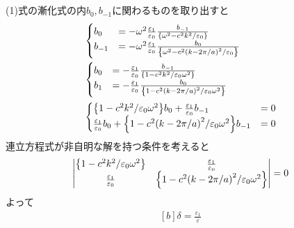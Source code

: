 \documentclass[../../master.tex]{subfiles}
\begin{document}
\section{}
(1)式の漸化式の内\(b_0,b_{-1}\)に関わるものを取り出すと
\begin{equation}\begin{aligned}[b]
    &\begin{cases}
        b_0 &= -\omega^2\frac{\varepsilon_1}{\varepsilon_0}\frac{b_{-1}}{\qty{\omega^2-c^2k^2/\varepsilon_0}}\\
        b_{-1} &= -\omega^2\frac{\varepsilon_1}{\varepsilon_0}\frac{b_{0}}{\qty{\omega^2-c^2\qty(k-2\pi/a)^2/\varepsilon_0}}
    \end{cases}\\
    &\begin{cases}
        b_0 &= -\frac{\varepsilon_1}{\varepsilon_0}\frac{b_{-1}}{\qty{1-c^2k^2/\varepsilon_0\omega^2}}\\
        b_1 &= -\frac{\varepsilon_1}{\varepsilon_0}\frac{b_{0}}{\qty{1-c^2\qty(k-2\pi/a)^2/\varepsilon_0\omega^2}}
    \end{cases}\\
    &\begin{cases}
        \qty{1-c^2k^2/\varepsilon_0\omega^2}b_0 + \frac{\varepsilon_1}{\varepsilon_0}b_{-1}&=0\\
        \frac{\varepsilon_1}{\varepsilon_0}b_{0}+ \qty{1-c^2\qty(k-2\pi/a)^2/\varepsilon_0\omega^2}b_{-1} &= 0
    \end{cases}\\
\end{aligned}\end{equation}
連立方程式が非自明な解を持つ条件を考えると
\begin{equation}\begin{aligned}[b]
    \begin{vmatrix}
        \qty{1-c^2k^2/\varepsilon_0\omega^2}& \frac{\varepsilon_1}{\varepsilon_0}\\
        \frac{\varepsilon_1}{\varepsilon_0} & \qty{1-c^2\qty(k-2\pi/a)^2/\varepsilon_0\omega^2}
    \end{vmatrix}=0
\end{aligned}\end{equation}
よって
\begin{equation}\begin{aligned}[b]
    \delta = \frac{\varepsilon_1}{\varepsilon}
\end{aligned}\end{equation}
\end{document}
